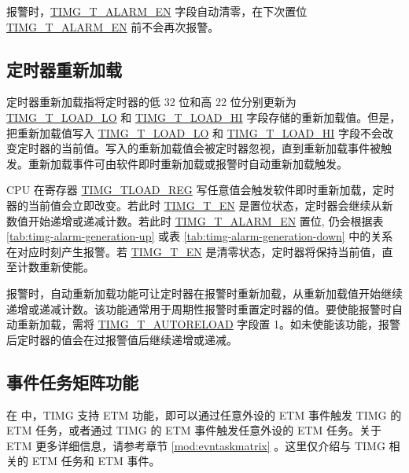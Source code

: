 \documentclass[main\_\_CN.tex]{subfiles}
\begin{document}
报警时，\hyperref[fielddesc:TIMGTXALARMEN]{TIMG\_T\_ALARM\_EN} 字段自动清零，在下次置位 \hyperref[fielddesc:TIMGTXALARMEN]{TIMG\_T\_ALARM\_EN} 前不会再次报警。

\subsection{定时器重新加载} \label{sec:timg-func-descr-reload}
定时器重新加载指将定时器的低 32 位和高 22 位分别更新为 \hyperref[fielddesc:TIMGTXLOADLO]{TIMG\_T\_LOAD\_LO} 和 \hyperref[fielddesc:TIMGTXLOADHI]{TIMG\_T\_LOAD\_HI} 字段存储的重新加载值。但是，把重新加载值写入 \hyperref[fielddesc:TIMGTXLOADLO]{TIMG\_T\_LOAD\_LO} 和 \hyperref[fielddesc:TIMGTXLOADHI]{TIMG\_T\_LOAD\_HI} 字段不会改变定时器的当前值。写入的重新加载值会被定时器忽视，直到重新加载事件被触发。重新加载事件可由软件即时重新加载或报警时自动重新加载触发。

CPU 在寄存器 \hyperref[regdesc:TIMGTXLOADREG]{TIMG\_TLOAD\_REG} 写任意值会触发软件即时重新加载，定时器的当前值会立即改变。若此时 \hyperref[fielddesc:TIMGTXEN]{TIMG\_T\_EN} 是置位状态，定时器会继续从新数值开始递增或递减计数。若此时 \hyperref[fielddesc:TIMGTXALARMEN]{TIMG\_T\_ALARM\_EN} 置位, 仍会根据表 \ref{tab:timg-alarm-generation-up} 或表 \ref{tab:timg-alarm-generation-down} 中的关系在对应时刻产生报警。若 \hyperref[fielddesc:TIMGTXEN]{TIMG\_T\_EN} 是清零状态，定时器将保持当前值，直至计数重新使能。

报警时，自动重新加载功能可让定时器在报警时重新加载，从重新加载值开始继续递增或递减计数。该功能通常用于周期性报警时重置定时器的值。要使能报警时自动重新加载，需将 \hyperref[fielddesc:TIMGTXAUTORELOAD]{TIMG\_T\_AUTORELOAD} 字段置 1。如未使能该功能，报警后定时器的值会在过报警值后继续递增或递减。


\subsection{事件任务矩阵功能}
\label{sec:timg-etm-func}

在 \chipname{} 中，TIMG 支持 ETM 功能，即可以通过任意外设的 ETM 事件触发 TIMG 的 ETM 任务，或者通过 TIMG 的 ETM 事件触发任意外设的 ETM 任务。关于 ETM 更多详细信息，请参考章节 \ref{mod:evntaskmatrix} 。这里仅介绍与 TIMG 相关的 ETM 任务和 ETM 事件。
\end{document}
